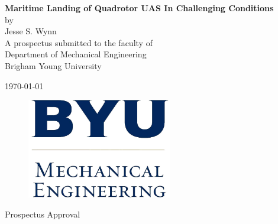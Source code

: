 \documentclass[12pt, letterpaper]{article}
\begin{document}
\begin{titlepage}

\begin{center}

\vspace*{\fill}

\vspace{0.5in}

{ \LARGE \bfseries Maritime Landing of Quadrotor UAS In Challenging Conditions}\\[.25in]

\large
by\\[.25 in]
Jesse S. Wynn\\[1in]

A prospectus submitted to the faculty of\\
Department of Mechanical Engineering\\
Brigham Young University

\vspace{1in}

\today

\vspace*{\fill}

\end{center}

\end{titlepage}

\thispagestyle{empty}

\begin{center}
\vspace*{\fill}

\begin{figure}[htbp] %
   \centering
   \includegraphics[width=2.5in]{byume_logo_clear.jpg} 
\end{figure}

\vspace{0.5in}

\Large{Prospectus Approval}\\[0.5in]

\end{center}
\end{document}
